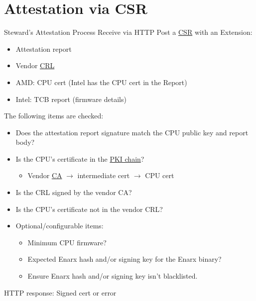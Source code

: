 \documentclass[graphics,compress]{beamer}
\begin{document}
\section{Attestation via CSR}
\begin{frame}{Steward's Attestation Process}
Receive via HTTP Post a \href{https://en.wikipedia.org/wiki/Certificate_signing_request}{CSR} with an Extension:
\begin{itemize}
    \item Attestation report
    \item Vendor \href{https://en.wikipedia.org/wiki/Certificate_revocation_list}{CRL}
    \item AMD: CPU cert (Intel has the CPU cert in the Report)
    \item Intel: TCB report (firmware details)
\end{itemize}

The following items are checked:
\begin{itemize}
    \item Does the attestation report signature match the CPU public key and report body?
    \item Is the CPU's certificate in the \href{https://en.wikipedia.org/wiki/Chain_of_trust}{PKI chain}?
    \begin{itemize}
        \item Vendor \href{https://en.wikipedia.org/wiki/Certificate_authority}{CA} $\rightarrow$ intermediate cert $\rightarrow$ CPU cert
    \end{itemize}
    \item Is the CRL signed by the vendor CA?
    \item Is the CPU's certificate not in the vendor CRL?
    \item Optional/configurable items:
    \begin{itemize}
        \item Minimum CPU firmware?
        \item Expected Enarx hash and/or signing key for the Enarx binary?
        \item Ensure Enarx hash and/or signing key isn't blacklisted.
    \end{itemize}
\end{itemize}

HTTP response: Signed cert or error
\end{frame}
\end{document}

